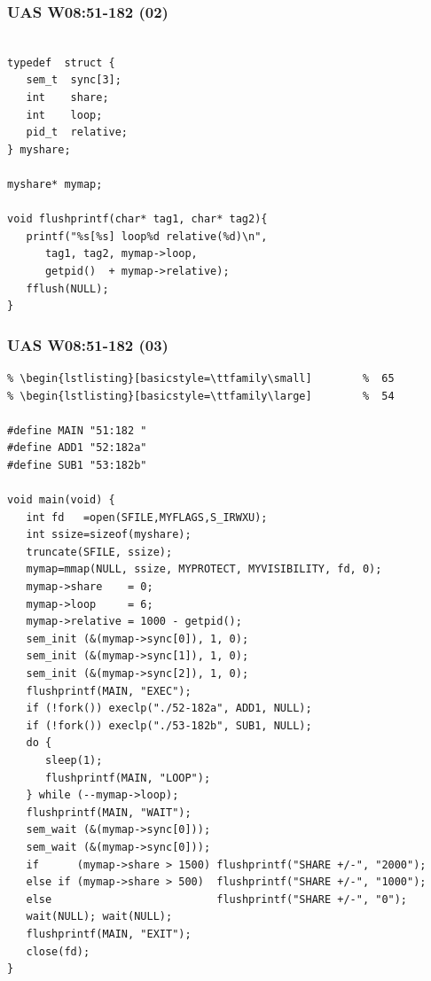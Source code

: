 \documentclass[aspectratio=169, xcolor=table, notheorems, hyperref={pdfpagelabels=false}]{beamer}
\begin{document}
\begin{frame}[fragile]
\frametitle{UAS W08:51-182 (02)}
\begin{lstlisting}[basicstyle=\ttfamily\large]        %  54

typedef  struct {
   sem_t  sync[3];
   int    share;
   int    loop;
   pid_t  relative;
} myshare;

myshare* mymap;

void flushprintf(char* tag1, char* tag2){
   printf("%s[%s] loop%d relative(%d)\n", 
      tag1, tag2, mymap->loop, 
      getpid()  + mymap->relative);
   fflush(NULL);
}

\end{lstlisting}
\end{frame}

\begin{frame}[fragile]
\frametitle{UAS W08:51-182 (03)}
\begin{lstlisting}[basicstyle=\ttfamily\tiny]         % 108
% \begin{lstlisting}[basicstyle=\ttfamily\footnotesize] %  72
% \begin{lstlisting}[basicstyle=\ttfamily\small]        %  65
% \begin{lstlisting}[basicstyle=\ttfamily\large]        %  54

#define MAIN "51:182 "
#define ADD1 "52:182a"
#define SUB1 "53:182b"

void main(void) {
   int fd   =open(SFILE,MYFLAGS,S_IRWXU);
   int ssize=sizeof(myshare);
   truncate(SFILE, ssize);
   mymap=mmap(NULL, ssize, MYPROTECT, MYVISIBILITY, fd, 0);
   mymap->share    = 0;
   mymap->loop     = 6;
   mymap->relative = 1000 - getpid();
   sem_init (&(mymap->sync[0]), 1, 0);
   sem_init (&(mymap->sync[1]), 1, 0);
   sem_init (&(mymap->sync[2]), 1, 0);
   flushprintf(MAIN, "EXEC");
   if (!fork()) execlp("./52-182a", ADD1, NULL);
   if (!fork()) execlp("./53-182b", SUB1, NULL);
   do {
      sleep(1);
      flushprintf(MAIN, "LOOP");
   } while (--mymap->loop);
   flushprintf(MAIN, "WAIT");
   sem_wait (&(mymap->sync[0]));
   sem_wait (&(mymap->sync[0]));
   if      (mymap->share > 1500) flushprintf("SHARE +/-", "2000");
   else if (mymap->share > 500)  flushprintf("SHARE +/-", "1000");
   else                          flushprintf("SHARE +/-", "0");
   wait(NULL); wait(NULL);
   flushprintf(MAIN, "EXIT");
   close(fd);
}

\end{lstlisting}
\end{frame}
\end{document}
